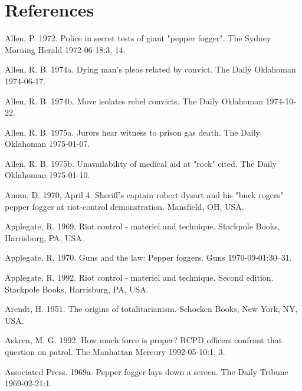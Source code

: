 \documentclass[
  11pt,
]{krantz}
\newlength{\cslhangindent}
\newlength{\cslentryspacingunit} %
\newenvironment{CSLReferences}[2] %
 {%
  \setlength{\parindent}{0pt}
  \ifodd #1
  \let\oldpar\par
  \def\par{\hangindent=\cslhangindent\oldpar}
  \fi
  \setlength{\parskip}{#2\cslentryspacingunit}
 }%
 {}
\begin{document}
\hypertarget{References}{%
\chapter*{References}\label{References}}


\hypertarget{refs}{}
\begin{CSLReferences}{1}{0}
\leavevmode{}%
Allen, P. 1972. Police in secret tests of giant "pepper fogger". The Sydney Morning Herald 1972-06-18:3, 14.

\leavevmode{}%
Allen, R. B. 1974a. Dying man's pleas related by convict. The Daily Oklahoman 1974-06-17.

\leavevmode{}%
Allen, R. B. 1974b. Move isolates rebel convicts. The Daily Oklahoman 1974-10-22.

\leavevmode{}%
Allen, R. B. 1975a. Jurors hear witness to prison gas death. The Daily Oklahoman 1975-01-07.

\leavevmode{}%
Allen, R. B. 1975b. Unavailability of medical aid at "rock" cited. The Daily Oklahoman 1975-01-10.

\leavevmode{}%
Aman, D. 1970, April 4. Sheriff's captain robert dysart and his "buck rogers" pepper fogger at riot-control demonstration. Mansfield, OH, USA.

\leavevmode{}%
Applegate, R. 1969. Riot control - materiel and technique. Stackpole Books, Harrisburg, PA, USA.

\leavevmode{}%
Applegate, R. 1970. Guns and the law: Pepper foggers. Guns 1970-09-01:30--31.

\leavevmode{}%
Applegate, R. 1992. Riot control - materiel and technique. Second edition. Stackpole Books, Harrisburg, PA, USA.

\leavevmode{}%
Arendt, H. 1951. The origins of totalitarianism. Schocken Books, New York, NY, USA.

\leavevmode{}%
Askren, M. G. 1992. How much force is proper? RCPD officers confront that question on patrol. The Manhattan Mercury 1992-05-10:1, 3.

\leavevmode{}%
Associated Press. 1969a. Pepper fogger lays down a screen. The Daily Tribune 1969-02-21:1.


\end{CSLReferences}
\end{document}
